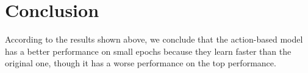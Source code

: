 \documentclass[10pt,twocolumn,letterpaper]{article}
\begin{document}
\section{Conclusion}
According to the results shown above, we conclude that the action-based model has a better performance on small epochs because 
they learn faster than the original one, though it has a worse performance on the top performance.


\newpage

{\small


}
\end{document}
